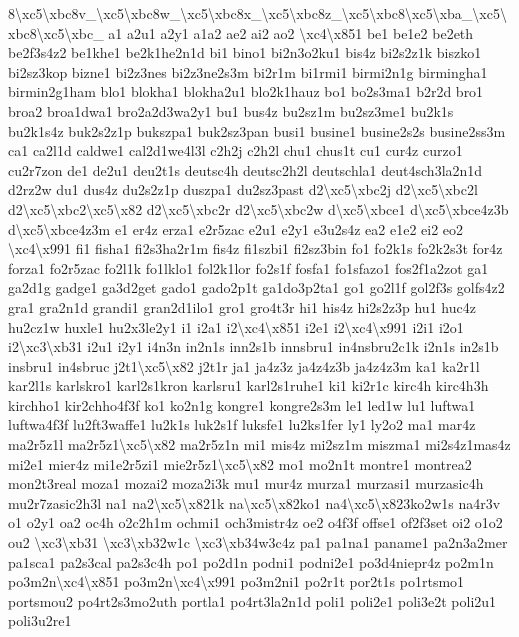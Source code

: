 {8\textbackslash{}xc5\textbackslash{}xbc8v\-\_\textbackslash{}xc5\textbackslash{}xbc8w\-\_\textbackslash{}xc5\textbackslash{}xbc8x\-\_\textbackslash{}xc5\textbackslash{}xbc8z\-\_\textbackslash{}xc5\textbackslash{}xbc8\textbackslash{}xc5\textbackslash{}xba\-\_\textbackslash{}xc5\textbackslash{}xbc8\textbackslash{}xc5\textbackslash{}xbc\-\_\- a1 a2u1 a2y1 a1a2 ae2 ai2 ao2 \textbackslash{}xc4\textbackslash{}x851 be1 be1e2 be2eth be2f3s4z2 be1khe1 be2k1he2n1d bi1 bino1 bi2n3o2ku1 bis4z bi2s2z1k biszko1 bi2sz3kop bizne1 bi2z3nes bi2z3ne2s3m bi2r1m bi1rmi1 birmi2n1g birmingha1 birmin2g1ham blo1 blokha1 blokha2u1 blo2k1hauz bo1 bo2s3ma1 b2r2d bro1 broa2 broa1dwa1 bro2a2d3wa2y1 bu1 bus4z bu2sz1m bu2sz3me1 bu2k1s bu2k1s4z buk2s2z1p bukszpa1 buk2sz3pan busi1 busine1 busine2s2s busine2ss3m ca1 ca2l1d caldwe1 cal2d1we4l3l c2h2j c2h2l chu1 chus1t cu1 cur4z curzo1 cu2r7zon de1 de2u1 deu2t1s deutsc4h deutsc2h2l deutschla1 deut4sch3la2n1d d2rz2w du1 dus4z du2s2z1p duszpa1 du2sz3past d2\textbackslash{}xc5\textbackslash{}xbc2j d2\textbackslash{}xc5\textbackslash{}xbc2l d2\textbackslash{}xc5\textbackslash{}xbc2\textbackslash{}xc5\textbackslash{}x82 d2\textbackslash{}xc5\textbackslash{}xbc2r d2\textbackslash{}xc5\textbackslash{}xbc2w d\textbackslash{}xc5\textbackslash{}xbce1 d\textbackslash{}xc5\textbackslash{}xbce4z3b d\textbackslash{}xc5\textbackslash{}xbce4z3m e1 er4z erza1 e2r5zac e2u1 e2y1 e3u2s4z ea2 e1e2 ei2 eo2 \textbackslash{}xc4\textbackslash{}x991 fi1 fisha1 fi2s3ha2r1m fis4z fi1szbi1 fi2sz3bin fo1 fo2k1s fo2k2s3t for4z forza1 fo2r5zac fo2l1k fo1lklo1 fol2k1lor fo2s1f fosfa1 fo1sfazo1 fos2f1a2zot ga1 ga2d1g gadge1 ga3d2get gado1 gado2p1t ga1do3p2ta1 go1 go2l1f gol2f3s golfs4z2 gra1 gra2n1d grandi1 gran2d1ilo1 gro1 gro4t3r hi1 his4z hi2s2z3p hu1 huc4z hu2cz1w huxle1 hu2x3le2y1 i1 i2a1 i2\textbackslash{}xc4\textbackslash{}x851 i2e1 i2\textbackslash{}xc4\textbackslash{}x991 i2i1 i2o1 i2\textbackslash{}xc3\textbackslash{}xb31 i2u1 i2y1 i4n3n in2n1s inn2s1b innsbru1 in4nsbru2c1k i2n1s in2s1b insbru1 in4sbruc j2t1\textbackslash{}xc5\textbackslash{}x82 j2t1r ja1 ja4z3z ja4z4z3b ja4z4z3m ka1 ka2r1l kar2l1s karlskro1 karl2s1kron karlsru1 karl2s1ruhe1 ki1 ki2r1c kirc4h kirc4h3h kirchho1 kir2chho4f3f ko1 ko2n1g kongre1 kongre2s3m le1 led1w lu1 luftwa1 luftwa4f3f lu2ft3waffe1 lu2k1s luk2s1f luksfe1 lu2ks1fer ly1 ly2o2 ma1 mar4z ma2r5z1l ma2r5z1\textbackslash{}xc5\textbackslash{}x82 ma2r5z1n mi1 mis4z mi2sz1m miszma1 mi2s4z1mas4z mi2e1 mier4z mi1e2r5zi1 mie2r5z1\textbackslash{}xc5\textbackslash{}x82 mo1 mo2n1t montre1 montrea2 mon2t3real moza1 mozai2 moza2i3k mu1 mur4z murza1 murzasi1 murzasic4h mu2r7zasic2h3l na1 na2\textbackslash{}xc5\textbackslash{}x821k na\textbackslash{}xc5\textbackslash{}x82ko1 na4\textbackslash{}xc5\textbackslash{}x823ko2w1s na4r3v o1 o2y1 oa2 oc4h o2c2h1m ochmi1 och3mistr4z oe2 o4f3f offse1 of2f3set oi2 o1o2 ou2 \textbackslash{}xc3\textbackslash{}xb31 \textbackslash{}xc3\textbackslash{}xb32w1c \textbackslash{}xc3\textbackslash{}xb34w3c4z pa1 pa1na1 paname1 pa2n3a2mer pa1sca1 pa2s3cal pa2s3c4h po1 po2d1n podni1 podni2e1 po3d4niepr4z po2m1n po3m2n\textbackslash{}xc4\textbackslash{}x851 po3m2n\textbackslash{}xc4\textbackslash{}x991 po3m2ni1 po2r1t por2t1s po1rtsmo1 portsmou2 po4rt2s3mo2uth portla1 po4rt3la2n1d poli1 poli2e1 poli3e2t poli2u1 poli3u2re1 }

